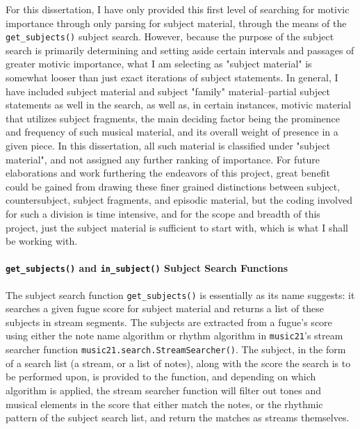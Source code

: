 For this dissertation, I have only provided this first level of
searching for motivic importance through only parsing for subject
material, through the means of the \texttt{get\_subjects()} subject
search. However, because the purpose of the subject search is primarily
determining and setting aside certain intervals and passages of greater
motivic importance, what I am selecting as "subject material" is
somewhat looser than just exact iterations of subject statements. In
general, I have included subject material and subject "family"
material--partial subject statements as well in the search, as well
as, in certain instances, motivic material that utilizes subject
fragments, the main deciding factor being the prominence and frequency
of such musical material, and its overall weight of presence in a given
piece. In this dissertation, all such material is classified under
"subject material", and not assigned any further ranking of importance.
For future elaborations and work furthering the endeavors of this
project, great benefit could be gained from drawing these finer grained
distinctions between subject, countersubject, subject fragments, and
episodic material, but the coding involved for such a division is time
intensive, and for the scope and breadth of this project, just the
subject material is sufficient to start with, which is what I shall be
working with.

\paragraph{\texorpdfstring{\texttt{get\_subjects()} and
\texttt{in\_subject()} Subject Search
Functions}{get\_subjects() and in\_subject() Subject Search Functions}}\label{get_subjects-and-in_subject-subject-search-functions}

The subject search function \texttt{get\_subjects()} is essentially as
its name suggests: it searches a given fugue score for subject material
and returns a list of these subjects in stream segments. The subjects
are extracted from a fugue's score using either the note name algorithm
or rhythm algorithm in \texttt{music21}'s stream searcher function
\texttt{music21.search.StreamSearcher()}. The subject, in the form of a
search list (a stream, or a list of notes), along with the score the
search is to be performed upon, is provided to the function, and
depending on which algorithm is applied, the stream searcher function
will filter out tones and musical elements in the score that either
match the notes, or the rhythmic pattern of the subject search list, and
return the matches as streams themselves.

